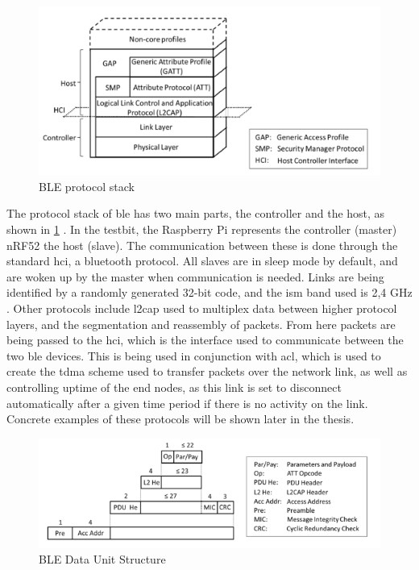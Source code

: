 \begin{figure}[ht]
    \centering
    \includegraphics[scale=0.7]{BLEprotocolStack.png}    
    \caption{BLE protocol stack}
    \label{fig:BLEprotocolStack}
\end{figure}

\noindent The protocol stack of \gls{ble} has two main parts, the controller and the host, as shown in \ref{fig:BLEprotocolStack} \cite{gomez2012overview}. In the testbit, the \gls{Raspberry Pi} represents the controller (master) \gls{nRF52} the host (slave). The communication between these is done through the standard \gls{hci}, a bluetooth protocol. All slaves are in sleep mode by default, and are woken up by the master when communication is needed. Links are being identified by a randomly generated 32-bit code, and the \gls{ism} band used is 2,4 GHz \cite{gomez2012overview}. Other protocols include \gls{l2cap} used to multiplex data between higher protocol layers, and the segmentation and reassembly of packets. From here packets are being passed to the \gls{hci}, which is the interface used to communicate between the two \gls{ble} devices. This is being used in conjunction with \gls{acl}, which is used to create the \gls{tdma} scheme used to transfer packets over the network link, as well as controlling uptime of the end nodes, as this link is set to disconnect automatically after a given time period if there is no activity on the link. Concrete examples of these protocols will be shown later in the thesis. 



\begin{figure}[ht]
    \centering
    \includegraphics[scale=0.7]{BLEdataUnitStructure.png}    
    \caption{BLE Data Unit Structure}
    \label{fig:BLEdataUnitStructure}
\end{figure}

